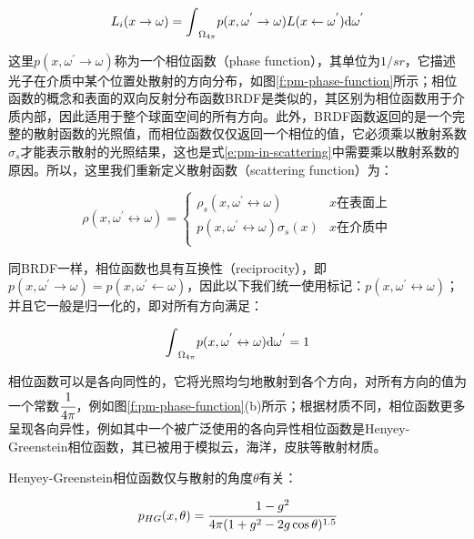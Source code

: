 \begin{equation}
	L_i(x\to{\omega})={\rm \int}_{\Omega_{4\pi}}p(x,{\omega}^{'}\to{\omega})L(x\leftarrow{\omega}^{'}){\rm d}{\omega}^{'}
\end{equation}

\noindent 这里$p(x,{\omega}^{'}\to{\omega})$称为一个相位函数（phase function），其单位为$1/sr$，它描述光子在介质中某个位置处散射的方向分布，如图\ref{f:pm-phase-function}所示；相位函数的概念和表面的双向反射分布函数BRDF是类似的，其区别为相位函数用于介质内部，因此适用于整个球面空间的所有方向。此外，BRDF函数返回的是一个完整的散射函数的光照值，而相位函数仅仅返回一个相位的值，它必须乘以散射系数$\sigma_s$才能表示散射的光照结果，这也是式\ref{e:pm-in-scattering}中需要乘以散射系数的原因。所以，这里我们重新定义散射函数（scattering function）为：

\begin{equation}\label{e:pm-scattering}
\rho(x,{\omega}^{'}\leftrightarrow{\omega})=\begin{cases}
	\rho_s(x,{\omega}^{'}\leftrightarrow{\omega})&\text{$x$在表面上}\\
	p(x,{\omega}^{'}\leftrightarrow{\omega})\sigma_s(x)&\text{$x$在介质中}\\
\end{cases}
\end{equation}

同BRDF一样，相位函数也具有互换性（reciprocity），即$p(x,{\omega}^{'}\to{\omega})=p(x,{\omega}^{'}\leftarrow{\omega})$，因此以下我们统一使用标记：$p(x,{\omega}^{'}\leftrightarrow{\omega})$；并且它一般是归一化的，即对所有方向满足：

\begin{equation}
	{\rm \int}_{\Omega_{4\pi}}p(x,{\omega}^{'}\leftrightarrow{\omega}){\rm d}{\omega}^{'}=1
\end{equation}

相位函数可以是各向同性的，它将光照均匀地散射到各个方向，对所有方向的值为一个常数$ \cfrac{1}{4\pi}$，例如图\ref{f:pm-phase-function}(b)所示；根据材质不同，相位函数更多呈现各向异性，例如其中一个被广泛使用的各向异性相位函数是Henyey-Greenstein相位函数\cite{a:Diffuseradiationinthegalaxy,a:EfficientMonteCarloMethodsforLightTransportinScatteringMedia}，其已被用于模拟云，海洋，皮肤等散射材质。

Henyey-Greenstein相位函数仅与散射的角度$\theta$有关：

\begin{equation}
	p_{HG}(x,\theta)= \cfrac{1-g^{2}}{4\pi(1+g^{2}-2g\cos{\theta})^{1.5}}
\end{equation}

